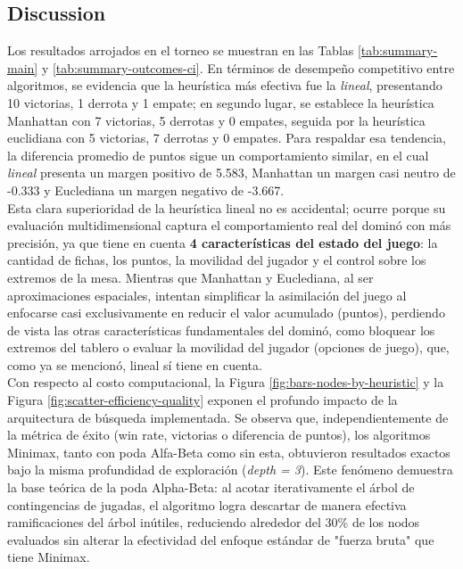 \documentclass[journal,onecolumn]{IEEEtran}
\begin{document}
\subsection{Discussion}
Los resultados arrojados en el torneo se muestran en las Tablas \ref{tab:summary-main} y \ref{tab:summary-outcomes-ci}. En términos de 
desempeño competitivo entre algoritmos, se evidencia que la heurística más efectiva fue la \textit{lineal}, presentando 10 victorias, 1 derrota y 1 empate; en segundo lugar, se establece la heurística Manhattan con 7 victorias, 5 derrotas y 0 empates, seguida por la heurística euclidiana con 5 victorias, 7 derrotas y 0 empates. Para respaldar esa tendencia, la diferencia promedio de puntos sigue un comportamiento similar, en el cual \textit{lineal} presenta un margen
positivo de 5.583, Manhattan un margen casi neutro de -0.333 y Euclediana un margen negativo de -3.667.\\

Esta clara superioridad de la heurística lineal no es accidental; ocurre porque su evaluación multidimensional captura el comportamiento real del dominó
con más precisión, ya que tiene en cuenta \textbf{4 características del estado del juego}: la cantidad de fichas, los puntos, la movilidad del jugador y el control sobre los extremos de la mesa. Mientras que Manhattan y Euclediana, al ser aproximaciones espaciales, intentan simplificar la asimilación del juego al enfocarse casi exclusivamente en reducir el valor acumulado (puntos), perdiendo de vista las otras características fundamentales del dominó, como bloquear los extremos del tablero o evaluar la movilidad del jugador (opciones de juego), que, como ya se mencionó, lineal sí tiene en cuenta.\\

Con respecto al costo computacional, la Figura \ref{fig:bars-nodes-by-heuristic} y la Figura \ref{fig:scatter-efficiency-quality} exponen el profundo impacto de la arquitectura de búsqueda implementada. Se observa que, independientemente de la métrica de éxito (win rate, victorias o diferencia de puntos), los algoritmos Minimax, tanto con poda Alfa-Beta como sin esta, obtuvieron resultados exactos bajo la misma profundidad de exploración (\textit{depth = 3}). Este fenómeno demuestra la base teórica de la poda Alpha-Beta: al acotar iterativamente el árbol de contingencias de jugadas, el algoritmo logra descartar de manera efectiva ramificaciones del árbol inútiles, reduciendo alrededor del 30\% de los nodos evaluados sin alterar la efectividad del enfoque estándar de "fuerza bruta" que tiene Minimax.\\
\end{document}
